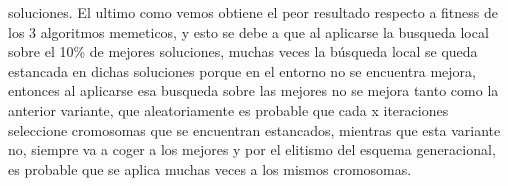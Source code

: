 \documentclass{article}
\begin{document}
soluciones.
\vspace{3mm}
\newline El ultimo como vemos obtiene el peor resultado respecto a fitness de los 3 algoritmos memeticos, y esto se debe a que al 
aplicarse la busqueda local sobre el 10\% de mejores soluciones, muchas veces la búsqueda local 
se queda estancada en dichas soluciones porque en el entorno no se encuentra mejora, entonces al aplicarse esa 
busqueda sobre las mejores no se mejora tanto como la anterior variante, que aleatoriamente es probable 
que cada x iteraciones seleccione cromosomas que se encuentran estancados, mientras que esta 
variante no, siempre va a coger a los mejores y por el elitismo del esquema generacional, es probable que 
se aplica muchas veces a los mismos cromosomas.
\end{document}
